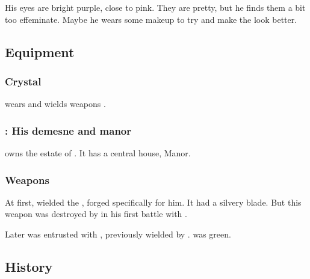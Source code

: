 His eyes are bright purple, close to pink. 
They are pretty, but he finds them a bit too effeminate. 
Maybe he wears some makeup to try and make the \colour look better. 









\subsection{Equipment}




\subsubsection{Crystal \armour}
\Teshrial{} wears \armour and wields weapons . 





\subsubsection{\Ruishagh: His demesne and manor}
\index{\Ruishagh}
\Teshrial{} owns the estate of \Ruishagh. 
It has a central house, \Ruishagh{} Manor. 





\subsubsection{Weapons}
\index{\Turishah}
At first, \Teshrial{} wielded the  \Turishah, forged specifically for him. 
It had a silvery blade. 
But this weapon was destroyed by \QuessanthIshnaruchaefir{} in his first battle with \Teshrial. 

\index{\Ossiraith}
Later \Teshrial{} was entrusted with \Ossiraith, previously wielded by \Menessiaraid. 
\Ossiraith{} was green. 









\subsection{History}





